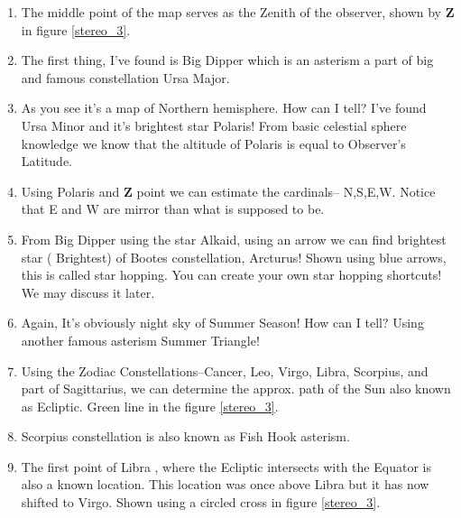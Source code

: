 \documentclass[a4paper,12pt]{extarticle}
\begin{document}
\begin{enumerate}
    \item The middle point of the map serves as the Zenith of the observer, shown by \textbf{Z} in figure \ref{stereo_3}.
    \item The first thing, I've found is Big Dipper which is an asterism a part of big and famous constellation Ursa Major.
    \item As you see it’s a map of Northern hemisphere. How can I tell? I've found Ursa Minor and it's brightest star Polaris! From basic celestial sphere knowledge we know that the altitude of Polaris is equal to Observer's Latitude.
    \item Using Polaris and \textbf{Z} point we can estimate the cardinals-- N,S,E,W. Notice that E and W are mirror than what is supposed to be. 
    \item From Big Dipper using the star Alkaid, using an arrow we can find brightest star ( Brightest) of Bootes constellation, Arcturus! Shown using blue arrows, this is called star hopping. You can create your own star hopping shortcuts! We may discuss it later.
    \item Again, It's obviously night sky of Summer Season! How can I tell? Using another famous asterism Summer Triangle!
    \item Using the Zodiac Constellations--Cancer, Leo, Virgo, Libra, Scorpius, and part of Sagittarius, we can determine the approx. path of the Sun also known as Ecliptic. Green line in the figure \ref{stereo_3}.
    \item Scorpius constellation is also known as Fish Hook asterism.
    \item The first point of Libra \libra , where the Ecliptic intersects with the Equator is also a known location. This location was once above Libra but it has now shifted to Virgo. Shown using a circled cross in figure \ref{stereo_3}. 
\end{enumerate}
\end{document}
